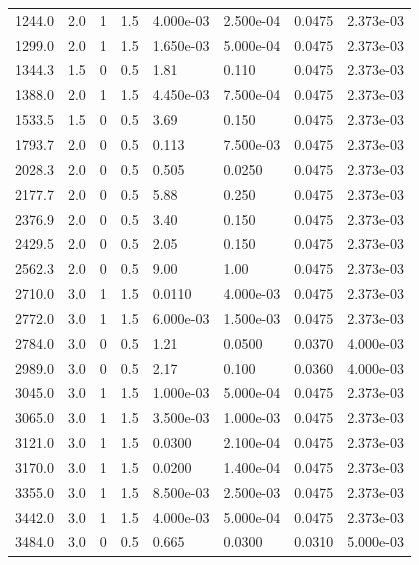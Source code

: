 \documentclass[preview]{standalone}
\begin{document}
{{\begin{tabular}{L{1.2cm}C{1.2cm} C{0.3cm}C{0.5cm} C{1.4cm}C{1.4cm} C{1.4cm}C{1.4cm}}
  1244.0  &   2.0  & 1     & 1.5 &  4.000e-03  & 2.500e-04  & 0.0475 &  2.373e-03   \\ 
  1299.0  &   2.0  & 1     & 1.5 &  1.650e-03  & 5.000e-04  & 0.0475 &  2.373e-03   \\ 
  1344.3  &   1.5  & 0     & 0.5 &  1.81  & 0.110  & 0.0475 &  2.373e-03   \\ 
  1388.0  &   2.0  & 1     & 1.5 &  4.450e-03  & 7.500e-04  & 0.0475 &  2.373e-03   \\ 
  1533.5  &   1.5  & 0     & 0.5 &  3.69  & 0.150  & 0.0475 &  2.373e-03   \\ 
  1793.7  &   2.0  & 0     & 0.5 &  0.113  & 7.500e-03  & 0.0475 &  2.373e-03   \\ 
  2028.3  &   2.0  & 0     & 0.5 &  0.505  & 0.0250  & 0.0475 &  2.373e-03   \\ 
  2177.7  &   2.0  & 0     & 0.5 &  5.88  & 0.250  & 0.0475 &  2.373e-03   \\ 
  2376.9  &   2.0  & 0     & 0.5 &  3.40  & 0.150  & 0.0475 &  2.373e-03   \\ 
  2429.5  &   2.0  & 0     & 0.5 &  2.05  & 0.150  & 0.0475 &  2.373e-03   \\ 
  2562.3  &   2.0  & 0     & 0.5 &  9.00  & 1.00  & 0.0475 &  2.373e-03   \\ 
  2710.0  &   3.0  & 1     & 1.5 &  0.0110  & 4.000e-03  & 0.0475 &  2.373e-03   \\ 
  2772.0  &   3.0  & 1     & 1.5 &  6.000e-03  & 1.500e-03  & 0.0475 &  2.373e-03   \\ 
  2784.0  &   3.0  & 0     & 0.5 &  1.21  & 0.0500  & 0.0370 &  4.000e-03   \\ 
  2989.0  &   3.0  & 0     & 0.5 &  2.17  & 0.100  & 0.0360 &  4.000e-03   \\ 
  3045.0  &   3.0  & 1     & 1.5 &  1.000e-03  & 5.000e-04  & 0.0475 &  2.373e-03   \\ 
  3065.0  &   3.0  & 1     & 1.5 &  3.500e-03  & 1.000e-03  & 0.0475 &  2.373e-03   \\ 
  3121.0  &   3.0  & 1     & 1.5 &  0.0300  & 2.100e-04  & 0.0475 &  2.373e-03   \\ 
  3170.0  &   3.0  & 1     & 1.5 &  0.0200  & 1.400e-04  & 0.0475 &  2.373e-03   \\ 
  3355.0  &   3.0  & 1     & 1.5 &  8.500e-03  & 2.500e-03  & 0.0475 &  2.373e-03   \\ 
  3442.0  &   3.0  & 1     & 1.5 &  4.000e-03  & 5.000e-04  & 0.0475 &  2.373e-03   \\ 
  3484.0  &   3.0  & 0     & 0.5 &  0.665  & 0.0300  & 0.0310 &  5.000e-03   \\ 

\end{tabular}}}
\end{document}

